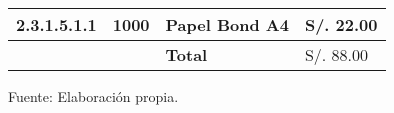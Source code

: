 \begin{table}[h!]
\begin{tabular}{|p{2.2cm}|p{1.8cm}|p{3.8cm}|p{2.2cm}|}
                2.3.1.5.1.1 &
                1000 &
                Papel Bond A4 &
                S/. 22.00
                \\ \hline

                &
                &
                \bf{Total} &
                S/. 88.00
                \\ \hline
                \end{tabular}
                \begin{center}
                    \vskip -0.2cm
                    {\small{Fuente: Elaboración propia.}}
                \end{center}
            \end{table}

